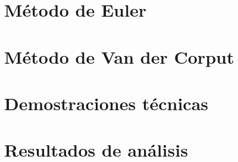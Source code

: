 \documentclass[a4paper,12pt,oneside]{book}
\begin{document}
\chapter{Método de Euler}


\chapter{Método de Van der Corput}



%

%
\nocite{*}
\printbibliography[heading=bibintoc]


\appendix %

\chapter{Demostraciones técnicas}\label{Apendice_A}


\chapter{Resultados de análisis}\label{Apendice_B} 


% 

% 

\newpage %
\thispagestyle{empty} %
\mbox{}

\end{document}
